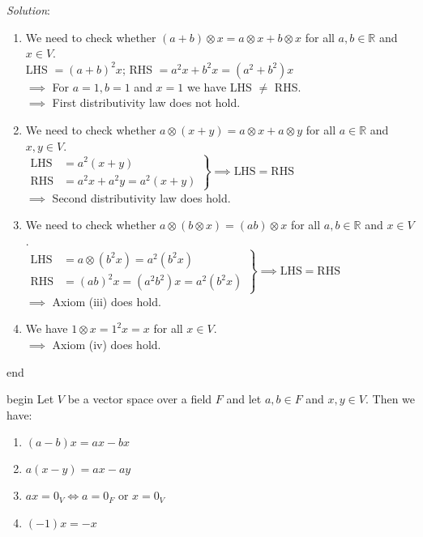 \documentclass[
  12pt,
  a4paper,
  twoside]{article}
\providecommand{\tightlist}{%
  \setlength{\itemsep}{0pt}\setlength{\parskip}{0pt}}
\theoremstyle{plain}
\theoremstyle{definition}
\begin{document}
\emph{Solution}:

\begin{enumerate}
\def\labelenumi{(\roman{enumi})}
\item
  We need to check whether \((a+b) \otimes x = a \otimes x + b \otimes x\) for all \(a,b \in \mathbb{R}\) and \(x \in V\).\\
  LHS \(= (a+b)^{2} x\); RHS \(= a^{2}x + b^{2}x = (a^{2} + b^{2})x\)\\
  \(\implies\) For \(a=1, b=1\) and \(x=1\) we have LHS \(\neq\) RHS.\\
  \(\implies\) First distributivity law does not hold.
\item
  We need to check whether \(a \otimes (x + y) = a \otimes x + a \otimes y\) for all \(a \in \mathbb{R}\) and \(x,y \in V\).\\
  \(\left. \begin{aligned} \text{LHS} & = a^{2}(x+y) \\ \text{RHS} & = a^{2}x + a^{2}y = a^{2}(x+y) \end{aligned} \right\} \implies \text{LHS} = \text{RHS}\)\\
  \(\implies\) Second distributivity law does hold.
\item
  We need to check whether \(a \otimes (b \otimes x) = (ab) \otimes x\) for all \(a,b \in \mathbb{R}\) and \(x \in V\).\\
  \(\left. \begin{aligned} \text{LHS} & = a \otimes (b^{2}x) = a^{2} (b^{2}x) \\ \text{RHS} & = (ab)^{2}x = (a^{2}b^{2})x = a^{2} (b^{2}x) \end{aligned} \right\} \implies \text{LHS} = \text{RHS}\)\\
  \(\implies\) Axiom (iii) does hold.
\item
  We have \(1 \otimes x = 1^{2} x = x\) for all \(x \in V\).\\
  \(\implies\) Axiom (iv) does hold.
\end{enumerate}

\csname end

\csname begin\label{cnj:prop-vsbasics}
Let \(V\) be a vector space over a field \(F\) and let \(a,b \in F\) and \(x,y \in V\). Then we have:

\begin{enumerate}
\def\labelenumi{(\alph{enumi})}
\tightlist
\item
  \((a-b)x = ax - bx\)
\item
  \(a(x-y) = ax - ay\)
\item
  \(ax = 0_{V} \iff a = 0_{F}\) or \(x=0_{V}\)
\item
  \((-1)x = -x\)
\end{enumerate}
\end{document}
